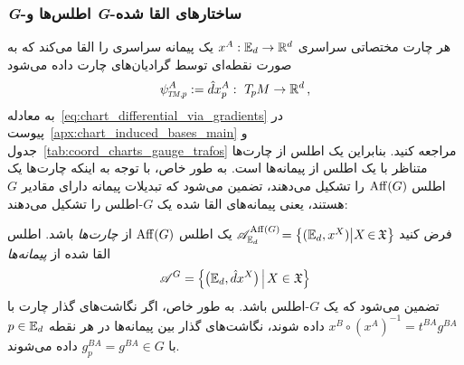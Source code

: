 \subsubsection{\textit{G}-اطلس‌ها و \textit{G}-ساختارهای القا شده}
هر چارت مختصاتی سراسری $x^A: \mathbb{E}_d \to \mathbb{R}^d$ یک پیمانه سراسری را القا می‌کند که به صورت نقطه‌ای توسط گرادیان‌های چارت داده می‌شود
\begin{align}
	\psiTMp^A := \hat{d}x_p^A :\ \TpM \to \R^d \,,
\end{align}
به معادله~\eqref{eq:chart_differential_via_gradients} در پیوست~\ref{apx:chart_induced_bases_main} و جدول~\ref{tab:coord_charts_gauge_trafos} مراجعه کنید.
بنابراین یک اطلس از چارت‌ها متناظر با یک اطلس از پیمانه‌ها است.
به طور خاص، با توجه به اینکه چارت‌ها یک اطلس $\operatorname{Aff}(G)$ را تشکیل می‌دهند، تضمین می‌شود که تبدیلات پیمانه دارای مقادیر $G$ هستند، یعنی پیمانه‌های القا شده یک $G$-اطلس را تشکیل می‌دهند:
\begin{thm}
	\label{thm:AffG_atlas_induced_G_atlas}
	فرض کنید ${\mathscr{A}^{\operatorname{Aff}(G)}_{\mathbb{E}_d} \!= \big\{ ( \mathbb{E}_d, x^X ) \big| X \mkern-2mu\in\mkern-2mu \mathfrak{X} \big\}}$ یک اطلس $\operatorname{Aff}(G)$ از \emph{چارت‌ها} باشد.
	اطلس القا شده از \emph{پیمانه‌ها}
	\begin{align}
		\mathscr{A}^G = \pig\{ \big(\Euc_d, \hat{d}x^X \big) \,\pig|\, X \in \mathfrak{X} \pig\}
	\end{align}
	تضمین می‌شود که یک $G$-اطلس باشد.
	به طور خاص، اگر نگاشت‌های گذار چارت با ${x^B \circ (x^A)^{-1}} = t^{BA} g^{BA}$ داده شوند، نگاشت‌های گذار بین پیمانه‌ها در هر نقطه $p\in \mathbb{E}_d$ با ${g_p^{BA} = g^{BA} \in G}$ داده می‌شوند.
\end{thm}
